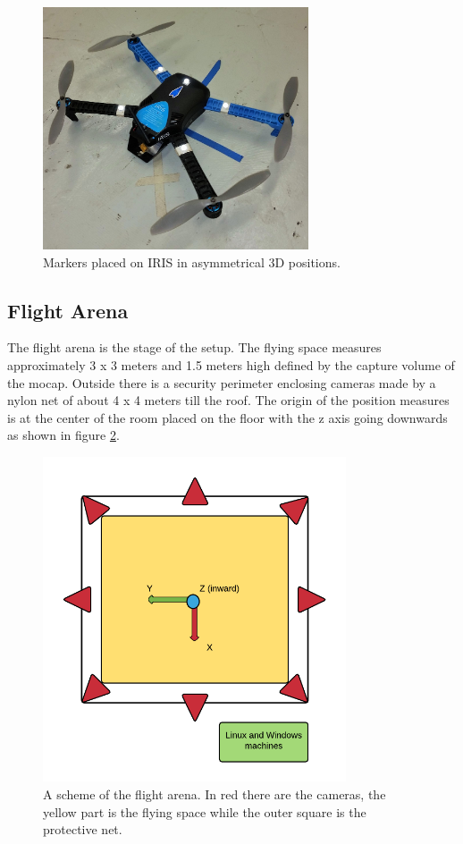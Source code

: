 \begin{figure}[h]
\centering
 \includegraphics[width=0.7\textwidth]{irismarker.jpg}
 \caption[Marker placement on IRIS]{Markers placed on IRIS in asymmetrical 3D positions.}
 \label{figure:markedIRIS}
\end{figure}

\newpage

\subsection{Flight Arena}
The flight arena is the stage of the setup. The flying space measures approximately 3 x 3 meters and 1.5 meters high defined by the capture volume of the mocap. Outside there is a security perimeter enclosing cameras made by a nylon net of about 4 x 4 meters till the roof. The origin of the position measures is at the center of the room placed on the floor with the z axis going downwards as shown in figure \ref{figure:arena}.

\begin{figure}[h]
\centering
 \includegraphics[width=0.8\textwidth]{flight_arena.png}
 \caption[Flight arena]{A scheme of the flight arena. In red there are the cameras, the yellow part is the flying space while the outer square is the protective net.}
 \label{figure:arena}
\end{figure}


